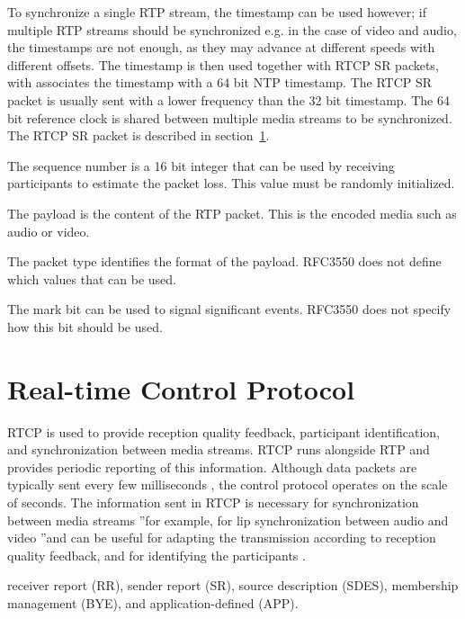 To synchronize a single RTP stream, the timestamp can be used however; if multiple RTP streams should be synchronized e.g. in the case of video and audio, the timestamps are not enough, as they may advance at different speeds with different offsets. The timestamp is then used together with RTCP SR packets, with associates the timestamp with a 64 bit NTP timestamp. The RTCP SR packet is usually sent with a lower frequency than the 32 bit timestamp. The 64 bit reference clock is shared between multiple media streams to be synchronized. The RTCP SR packet is described in section~\ref{sec:design:rtcp}.


The sequence number is a 16 bit integer that can be used by receiving participants to estimate the packet loss. This value must be randomly initialized.

The payload is the content of the RTP packet. This is the encoded media such as audio or video. 

The packet type identifies the format of the payload. RFC3550 does not define which values that can be used.


The mark bit can be used to signal significant events. RFC3550 does not specify how this bit should be used.




\section{Real-time Control Protocol} \label{sec:design:rtcp}
RTCP is used to provide reception quality feedback, participant identification, and synchronization between media streams. RTCP runs alongside RTP and provides periodic reporting of this information. Although data packets are typically sent every few milliseconds , the control protocol operates on the scale of seconds. The information sent in RTCP is necessary for synchronization between media streams ”for example, for lip synchronization between audio and video ”and can be useful for adapting the transmission according to reception quality feedback, and for identifying the participants . 

receiver report (RR), sender report (SR), source description (SDES), membership management (BYE), and application-defined (APP). 


